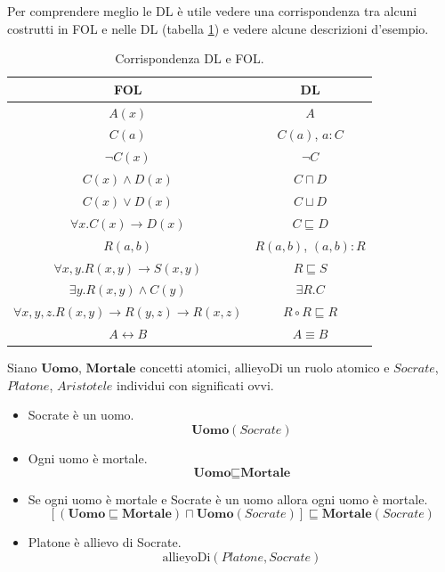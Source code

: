 \documentclass{article}
\begin{document}
Per comprendere meglio le DL è utile vedere una corrispondenza tra alcuni costrutti in FOL e nelle DL (tabella \ref{tab:DL_FOL}) e vedere alcune descrizioni d'esempio. 

\begin{table}[h!t]
    \centering
    \caption{Corrispondenza DL e FOL.}
    \label{tab:DL_FOL}
    \begin{tabular}{c c}
        \hline 
        \textbf{FOL} & \textbf{DL} \\
        \hline
        $ A(x) $ & $ A $ \\
        $ C(a) $ & $ C(a) $, $ a:C $ \\
        $ \neg C(x) $ & $ \neg C $ \\
        $ C(x) \land D(x) $ & $ C \sqcap D $ \\
        $ C(x) \lor D(x) $ & $ C \sqcup D $ \\
        $ \forall x . C(x) \rightarrow D(x) $ & $ C \sqsubseteq D $ \\
        $ R(a,b) $ & $ R(a,b) $, $ (a,b):R $ \\
        $ \forall x, y . R(x,y) \rightarrow S(x,y) $ & $ R \sqsubseteq S $ \\
        $ \exists y . R(x,y) \land C(y) $ & $ \exists R.C $ \\
        $ \forall x, y, z . R(x,y) \rightarrow R(y,z) \rightarrow R(x,z) $ & $ R \circ R \sqsubseteq R $ \\
        $ A \leftrightarrow B $ & $ A \equiv B $ \\
        \hline
    \end{tabular}
\end{table}

Siano $ \textbf{Uomo} $, $ \textbf{Mortale} $ concetti atomici, $ \underline{\textrm{allievoDi}} $ un ruolo atomico e $ Socrate $, $ Platone $, $ Aristotele $ individui con significati ovvi. 
\begin{itemize}
    \item Socrate è un uomo. 
    \begin{equation*}
         \textbf{Uomo}(Socrate)
    \end{equation*}
    \item Ogni uomo è mortale.
    \begin{equation*}
        \textbf{Uomo} \sqsubseteq \textbf{Mortale}
    \end{equation*}
    \item Se ogni uomo è mortale e Socrate è un uomo allora ogni uomo è mortale.
    \begin{equation}
        \label{eq:subsumption}
        [(\textbf{Uomo} \sqsubseteq \textbf{Mortale}) \sqcap \textbf{Uomo}(Socrate)] \sqsubseteq \textbf{Mortale}(Socrate)
    \end{equation}
    \item Platone è allievo di Socrate.
    \begin{equation*}
        \underline{\textrm{allievoDi}}(Platone, Socrate)
    \end{equation*}
\end{itemize}
\end{document}
